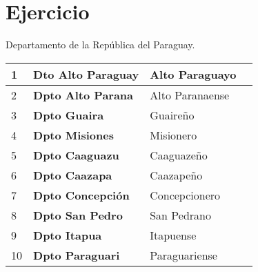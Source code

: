 \documentclass{article}
\begin{document}
\section{Ejercicio}

Departamento de la República del Paraguay.\\

\begin{tabular}{|l|l|l|r}
\hline
    1 & \textbf{Dto Alto Paraguay} & Alto Paraguayo \\ \hline
    2 & \textbf{Dpto Alto Parana} & Alto Paranaense \\ \hline
    3 & \textbf{Dpto Guaira } & Guaireño \\ \hline
    4 & \textbf{Dpto Misiones} & Misionero \\ \hline
    5 & \textbf{Dpto Caaguazu} & Caaguazeño \\ \hline
    6 & \textbf{Dpto Caazapa} & Caazapeño \\ \hline
    7 & \textbf{Dpto Concepción} & Concepcionero \\ \hline
    8 & \textbf{Dpto San Pedro} & San Pedrano \\ \hline
    9 & \textbf{Dpto Itapua} & Itapuense \\ \hline
    10 & \textbf{Dpto Paraguari} & Paraguariense \\ \hline
\end{tabular} 
\end{document}
